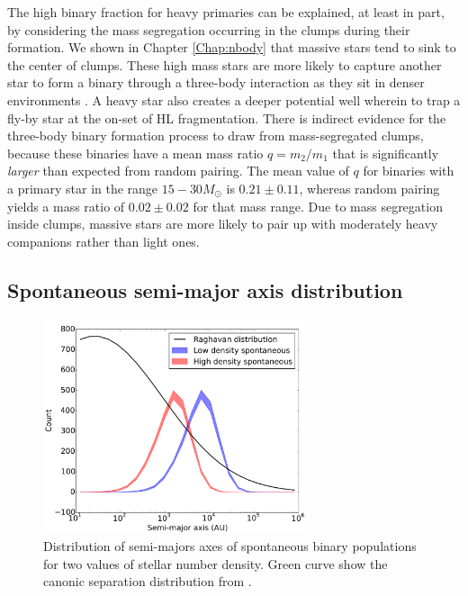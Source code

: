 The high binary fraction for heavy primaries can be explained, at least in part,  by considering the mass segregation occurring in the clumps during their formation. We shown in Chapter \ref{Chap:nbody} that massive stars tend to sink to the center of clumps. These high mass stars are more likely to capture another star to form a binary through a three-body interaction as they sit in denser environments \citep{Spitzer1987}. A heavy star also creates a deeper potential well wherein to trap a fly-by star at the on-set of HL fragmentation. There is indirect evidence for the three-body binary formation process to draw from mass-segregated clumps, because these binaries have a mean mass ratio $q = m_2/m_1$  that is significantly \textit{larger} than expected from random pairing. The mean value of $q$ for  binaries with a primary star in the range $15-30 M_\odot$  is $0.21 \pm 0.11$, whereas random pairing  yields a mass ratio of $0.02 \pm 0.02$ for that mass range. Due to mass segregation inside clumps, massive stars are more likely to pair up with moderately heavy companions rather than light ones.



\subsection{Spontaneous semi-major axis distribution}
\label{Sub:spontaneous_separations}



\begin{figure}
\begin{center}
\includegraphics[width=0.7\textwidth]{Figures/5_spontaneous_smaxis}
\caption[Spontaneous binary population: semi-major axis distribution]{Distribution of semi-majors axes of spontaneous binary populations for two values of stellar number density. Green curve show the canonic separation distribution from \protect\cite{Raghavan2010}. }
\label{Fig:5_spontaneous_smaxis}
\end{center}
\end{figure}

